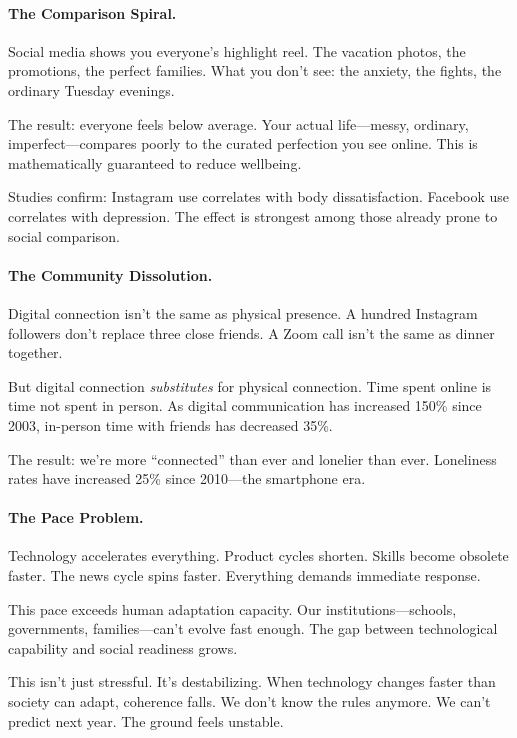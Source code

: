 \paragraph{The Comparison Spiral.}

Social media shows you everyone's highlight reel. The vacation photos, 
the promotions, the perfect families. What you don't see: the anxiety, 
the fights, the ordinary Tuesday evenings.

The result: everyone feels below average. Your actual life---messy, 
ordinary, imperfect---compares poorly to the curated perfection you see 
online. This is mathematically guaranteed to reduce wellbeing.

Studies confirm: Instagram use correlates with body dissatisfaction. 
Facebook use correlates with depression. The effect is strongest among 
those already prone to social comparison.

\paragraph{The Community Dissolution.}

Digital connection isn't the same as physical presence. A hundred 
Instagram followers don't replace three close friends. A Zoom call 
isn't the same as dinner together.

But digital connection \emph{substitutes} for physical connection. 
Time spent online is time not spent in person. As digital communication 
has increased 150\% since 2003, in-person time with friends has decreased 
35\%.

The result: we're more ``connected'' than ever and lonelier than ever. 
Loneliness rates have increased 25\% since 2010---the smartphone era.

\paragraph{The Pace Problem.}

Technology accelerates everything. Product cycles shorten. Skills become 
obsolete faster. The news cycle spins faster. Everything demands immediate 
response.

This pace exceeds human adaptation capacity. Our institutions---schools, 
governments, families---can't evolve fast enough. The gap between 
technological capability and social readiness grows.

This isn't just stressful. It's destabilizing. When technology changes 
faster than society can adapt, coherence falls. We don't know the rules 
anymore. We can't predict next year. The ground feels unstable.

